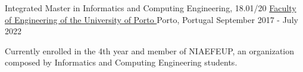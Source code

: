 
\begin{cventries}
  \cventry
    {Integrated Master in Informatics and Computing Engineering, 18.01/20} %
    {\href{https://sigarra.up.pt/feup/en/web_page.inicial}{Faculty of Engineering of the University of Porto \faExternalLink}} %
    {Porto, Portugal} %
    {September 2017 - July 2022} %
    {
      \begin{cvitems}
        \item {Currently enrolled in the 4th year and member of NIAEFEUP, an organization composed by Informatics and Computing Engineering students.}
      \end{cvitems}
    }
\end{cventries}
